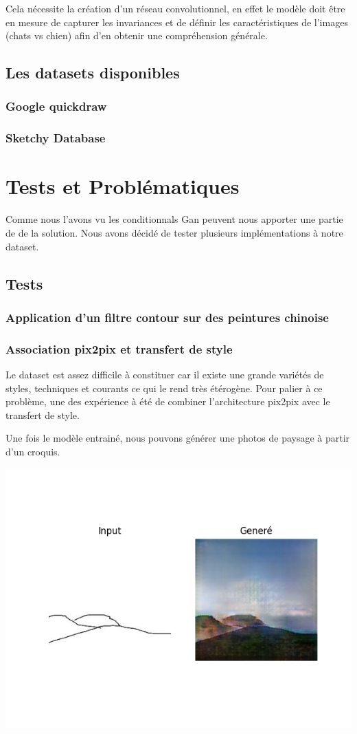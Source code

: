 \documentclass[a4paper, 12pt]{book}
\begin{document}
Cela nécessite la création d'un réseau convolutionnel, en effet le modèle doit être en mesure de capturer les invariances et de définir les caractéristiques de l'images (chats vs chien) afin d'en obtenir une compréhension générale.


\section{Les datasets disponibles}

\subsection{Google quickdraw}
\subsection{Sketchy Database}



\chapter{Tests et Problématiques}

Comme nous l'avons vu les conditionnals Gan peuvent nous apporter une partie de de la solution. Nous avons décidé de tester plusieurs implémentations à notre dataset. 

\section{Tests}

\subsection{Application d'un filtre contour sur des peintures chinoise}

\subsection{Association pix2pix et transfert de style}

Le dataset est assez difficile à constituer car il existe une grande variétés de styles, techniques et courants ce qui le rend très étérogène. Pour palier à ce problème, une des expérience à été de combiner l'architecture pix2pix avec le transfert de style.

Une fois le modèle entrainé, nous pouvons générer une photos de paysage à partir d'un croquis. 

\includegraphics[width=0.7\linewidth]{images/pix2pix-t1.png}
\end{document}

